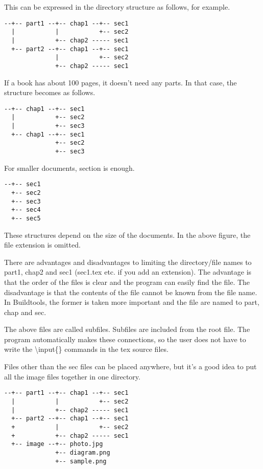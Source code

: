 \documentclass[
]{article}
\begin{document}
This can be expressed in the directory structure as follows, for
example.

\begin{verbatim}
--+-- part1 --+-- chap1 --+-- sec1
  |           |           +-- sec2
  |           +-- chap2 ----- sec1
  +-- part2 --+-- chap1 --+-- sec1
              |           +-- sec2
              +-- chap2 ----- sec1
\end{verbatim}

If a book has about 100 pages, it doesn't need any parts. In that case,
the structure becomes as follows.

\begin{verbatim}
--+-- chap1 --+-- sec1
  |           +-- sec2
  |           +-- sec3
  +-- chap1 --+-- sec1
              +-- sec2
              +-- sec3
\end{verbatim}

For smaller documents, section is enough.

\begin{verbatim}
--+-- sec1
  +-- sec2
  +-- sec3
  +-- sec4
  +-- sec5
\end{verbatim}

These structures depend on the size of the documents. In the above
figure, the file extension is omitted.

There are advantages and disadvantages to limiting the directory/file
names to part1, chap2 and sec1 (sec1.tex etc. if you add an extension).
The advantage is that the order of the files is clear and the program
can easily find the file. The disadvantage is that the contents of the
file cannot be known from the file name. In Buildtools, the former is
taken more important and the file are named to part, chap and sec.

The above files are called subfiles. Subfiles are included from the root
file. The program automatically makes these connections, so the user
does not have to write the \textbackslash input\{\} commands in the tex
source files.

Files other than the sec files can be placed anywhere, but it's a good
idea to put all the image files together in one directory.

\begin{verbatim}
--+-- part1 --+-- chap1 --+-- sec1
  |           |           +-- sec2
  |           +-- chap2 ----- sec1
  +-- part2 --+-- chap1 --+-- sec1
  +           |           +-- sec2
  +           +-- chap2 ----- sec1
  +-- image --+-- photo.jpg
              +-- diagram.png
              +-- sample.png
\end{verbatim}
\end{document}
